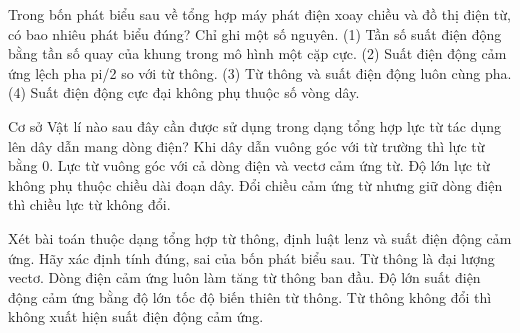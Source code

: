 \begin{ex}
Trong bốn phát biểu sau về tổng hợp máy phát điện xoay chiều và đồ thị điện từ, có bao nhiêu phát biểu đúng? Chỉ ghi một số nguyên. (1) Tần số suất điện động bằng tần số quay của khung trong mô hình một cặp cực. (2) Suất điện động cảm ứng lệch pha pi/2 so với từ thông. (3) Từ thông và suất điện động luôn cùng pha. (4) Suất điện động cực đại không phụ thuộc số vòng dây.
\end{ex}

\begin{ex}
Cơ sở Vật lí nào sau đây cần được sử dụng trong dạng tổng hợp lực từ tác dụng lên dây dẫn mang dòng điện?
\choice
{Khi dây dẫn vuông góc với từ trường thì lực từ bằng 0.}
{\True Lực từ vuông góc với cả dòng điện và vectơ cảm ứng từ.}
{Độ lớn lực từ không phụ thuộc chiều dài đoạn dây.}
{Đổi chiều cảm ứng từ nhưng giữ dòng điện thì chiều lực từ không đổi.}
\end{ex}

\begin{ex}
Xét bài toán thuộc dạng tổng hợp từ thông, định luật lenz và suất điện động cảm ứng. Hãy xác định tính đúng, sai của bốn phát biểu sau.
\choiceTF
{Từ thông là đại lượng vectơ.}
{Dòng điện cảm ứng luôn làm tăng từ thông ban đầu.}
{\True Độ lớn suất điện động cảm ứng bằng độ lớn tốc độ biến thiên từ thông.}
{\True Từ thông không đổi thì không xuất hiện suất điện động cảm ứng.}
\end{ex}

